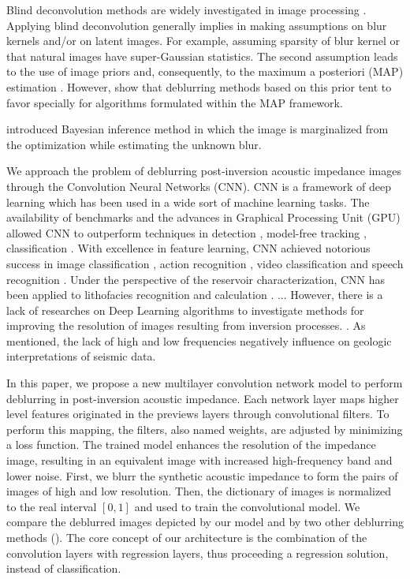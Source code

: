 \documentclass[conference,compsoc]{IEEEtran}
\begin{document}
Blind deconvolution methods are widely
investigated in image processing \cite{bishop}.
Applying blind deconvolution generally implies in making assumptions on
blur kernels and/or on latent images. For example, assuming sparsity of blur kernel
or that natural images have super-Gaussian statistics. The second assumption
leads to the use of image priors and, consequently, to the maximum a posteriori
(MAP) estimation \cite{babacan}. However, \cite{levin} show that deblurring methods
based on this prior tent to favor specially for algorithms formulated within the MAP framework.

\cite{levin} introduced Bayesian inference method in which the image is
marginalized from the optimization while estimating the unknown blur.



 We approach the problem of deblurring post-inversion acoustic impedance images through
the Convolution Neural Networks (CNN). CNN is a framework of deep learning which has been
used in a wide sort of machine learning tasks. The availability of benchmarks
\cite{Russakovsky} and the advances in Graphical Processing Unit (GPU) \cite{Buduma15}
allowed CNN to outperform techniques in detection \cite{Girshick,Bell}, model-free
tracking \cite{Nam}, classification \cite{He}. With excellence in feature learning,
CNN achieved notorious success in image classification \cite{Krizhevsky}, action
recognition \cite{S_Ji}, video classification \cite{AbdelHamid} and speech recognition \cite{Farfade}.
Under the perspective of the reservoir characterization, CNN has been applied to lithofacies recognition
\cite{qian} and calculation \cite{Liu}.
...
However, there is a lack of researches on Deep Learning algorithms to investigate methods for improving the resolution of
images resulting from inversion processes. . As mentioned, the lack
of high and low frequencies negatively influence on geologic interpretations of seismic data.

In this paper, we propose a new multilayer convolution network model to perform deblurring in post-inversion acoustic impedance.
Each network layer maps higher level features originated in the previews layers through convolutional filters.
To perform this mapping, the filters, also named weights, are adjusted by minimizing a loss function. The trained model enhances the
resolution of the impedance image, resulting in an equivalent image with increased high-frequency band and lower noise.
First, we blurr the synthetic acoustic impedance to form the pairs of images of high and low resolution. Then,
the dictionary of images is normalized to the real interval $[0,1]$ and used to train the convolutional model.
We compare the deblurred images depicted by our model and by two other deblurring methods ().
The core concept of our architecture is the combination of the convolution layers with regression
layers, thus proceeding a regression solution, instead of classification.
 
\end{document}
